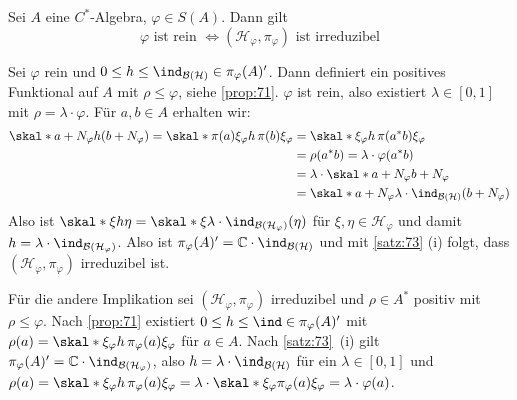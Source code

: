 \begin{satz}[{name=[Charakterisierung reiner Zustände]},label=satz:75]
	Sei $A$ eine $C^*$-Algebra, $\varphi \in S(A)$. Dann gilt
	\[
		\varphi \text{ ist rein } \iff (\mathcal{H}_\varphi, \pi_\varphi) \text{ ist irreduzibel}  
	\]
\end{satz}
\begin{beweis}
	Sei $\varphi$ rein und $0 \le h \le \ind_{\mathcal{B}(\mathcal{H})} \in \pi_\varphi(A)'$.
	Dann definiert 
	ein positives Funktional auf $A$ mit $\rho \le \varphi$, siehe \autoref{prop:71}.
	$\varphi$ ist rein, also existiert $\lambda \in [0,1]$ mit $\rho =\lambda \cdot \varphi$.
	Für $a,b \in A$ erhalten wir:
	\begin{align}
		\skal*{a +N_\varphi}{h (b+ N_\varphi)} = \skal*{\pi(a) \xi_\varphi}{h\,\pi(b)\xi_\varphi} &= \skal*{\xi_\varphi}{h\,\pi(a^*b)\xi_\varphi} \\
		&= \rho(a^*b) =\lambda \cdot \varphi(a^*b) \\
		&= \lambda \cdot \skal*{a+ N_\varphi}{b + N_\varphi} \\
		&= \skal*{a + N_\varphi}{\lambda \cdot \ind_{\mathcal{B}(\mathcal{H})}(b+ N_\varphi)}
	\end{align}
	Also ist $\skal*{\xi}{h \eta}= \skal*{\xi}{\lambda \cdot \ind_{\mathcal{B}(\mathcal{H}_\varphi)}(\eta)}$ für $\xi,\eta \in \mathcal{H}_\varphi$ und damit $h= \lambda \cdot \ind_{\mathcal{B}(\mathcal{H}_\varphi)}$.
	Also ist $\pi_\varphi(A)'= \mathbb{C} \cdot \ind_{\mathcal{B}(\mathcal{H})}$ und mit \autoref{satz:73} (i) folgt, dass $(\mathcal{H}_\varphi,\pi_\varphi)$ irreduzibel ist.
	
	Für die andere Implikation sei $(\mathcal{H}_\varphi,\pi_\varphi)$ irreduzibel und $\rho \in A^*$ positiv mit $\rho \le \varphi$.
	Nach \autoref{prop:71} existiert $0 \le h \le \ind \in \pi_\varphi(A)'$ mit $\rho(a) = \skal*{\xi_\varphi}{h\,\pi_\varphi(a)\xi_\varphi}$ für $a \in A$.
	Nach \autoref{satz:73}~(i) gilt $\pi_\varphi(A)'=\mathbb{C} \cdot \ind_{\mathcal{B}(\mathcal{H}_\varphi)}$, also $h= \lambda \cdot \ind_{\mathcal{B}(\mathcal{H})}$ für ein $\lambda \in [0,1]$ und $\rho(a)= \skal*{\xi_\varphi}{h\,\pi_\varphi(a)\xi_\varphi}= \lambda \cdot \skal*{\xi_\varphi}{\pi_\varphi(a)\xi_\varphi}= \lambda \cdot \varphi(a)$.
\end{beweis}

